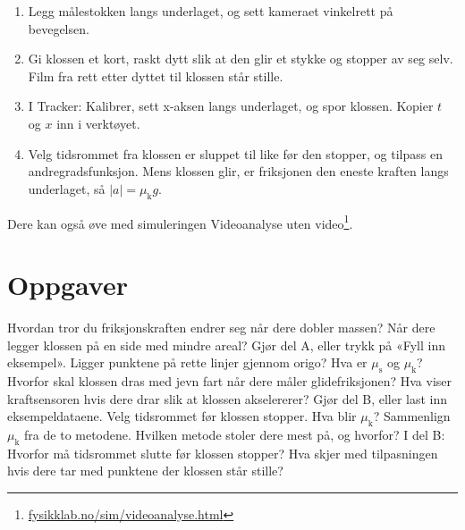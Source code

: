 \documentclass[11pt]{article}
\begin{document}
\begin{enumerate}
\item Legg målestokken langs underlaget, og sett kameraet vinkelrett på bevegelsen.
\item Gi klossen et kort, raskt dytt slik at den glir et stykke og stopper av seg selv. Film fra rett etter dyttet til klossen står stille.
\item I Tracker: Kalibrer, sett x-aksen langs underlaget, og spor klossen. Kopier $t$ og $x$ inn i verktøyet.
\item Velg tidsrommet fra klossen er sluppet til like før den stopper, og tilpass en andregradsfunksjon. Mens klossen glir, er friksjonen den eneste kraften langs underlaget, så $|a| = μ_{\mathrm{k}}g$.
\end{enumerate}

Dere kan også øve med simuleringen Videoanalyse uten video\footnote{\url{fysikklab.no/sim/videoanalyse.html}}.

\section*{Oppgaver}

\begin{oppgaveliste}
\oppgave {}Hvordan tror du friksjonskraften endrer seg når dere dobler massen? Når dere legger klossen på en side med mindre areal?
\svar
\oppgave {}Gjør del A, eller trykk på «Fyll inn eksempel». Ligger punktene på rette linjer gjennom origo? Hva er $μ_{\mathrm{s}}$ og $μ_{\mathrm{k}}$?
\svar
\oppgave {}Hvorfor skal klossen dras med jevn fart når dere måler glidefriksjonen? Hva viser kraftsensoren hvis dere drar slik at klossen akselererer?
\svar
\oppgave {}Gjør del B, eller last inn eksempeldataene. Velg tidsrommet før klossen stopper. Hva blir $μ_{\mathrm{k}}$?
\svar
\oppgave {}Sammenlign $μ_{\mathrm{k}}$ fra de to metodene. Hvilken metode stoler dere mest på, og hvorfor?
\svar
\oppgave {}I del B: Hvorfor må tidsrommet slutte før klossen stopper? Hva skjer med tilpasningen hvis dere tar med punktene der klossen står stille?
\svar
\end{oppgaveliste}
\end{document}
